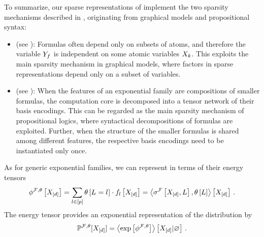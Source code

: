 
To summarize, our sparse representations of \MarkovLogicNetworks{} implement the two sparsity mechanisms described in , originating from graphical models and propositional syntax:
\begin{itemize}
    \item \textbf{\IndependenceMechanism{}} (see ):
    Formulas often depend only on subsets of atoms, and therefore the variable $Y_{f}$ is independent on some atomic variables $X_{k}$.
    This exploits the main sparsity mechanism in graphical models, where factors in sparse representations depend only on a subset of variables.
    \item \textbf{\ComputationMechanism{}} (see ):
    When the features of an exponential family are compositions of smaller formulas, the computation core is decomposed into a tensor network of their basis encodings.
    This can be regarded as the main sparsity mechanism of propositional logics, where syntactical decompositions of formulas are exploited.
    Further, when the structure of the smaller formulas is shared among different features, the respective basis encodings need to be instantiated only once.
\end{itemize}




As for generic exponential families, we can represent \MarkovLogicNetworks{} in terms of their energy tensors
\begin{align}
    \phi^{\mathcal{F},\theta}\left[X_{[d]}\right]
    = \sum_{l\in[p]} \theta\left[L_{}=l_{}\right] \cdot f_{l}\left[X_{[d]}\right]
    = \left\langle \sigma^{\mathcal{F}}\left[X_{[d]},L\right],\theta\left[L\right]\right\rangle \left[ X_{[d]} \right] \, .
\end{align}
The energy tensor provides an exponential representation of the distribution by
\begin{align}
    \mathbb{P}^{\mathcal{F},\theta}[X_{[d]}] = \left\langle \mathrm{exp}\left[\phi^{\mathcal{F},\theta}\right]\right\rangle \left[ X_{[d]} | \varnothing \right] \, .
\end{align}

